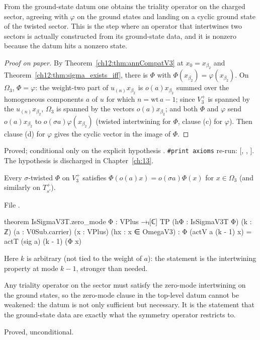 \begin{physics}
From the ground-state datum one obtains the triality operator on the charged sector, agreeing with $\varphi$ on the ground states and landing on a cyclic ground state of the twisted sector. This is the step where an operator that intertwines two sectors is actually constructed from its ground-state data, and it is nonzero because the datum hits a nonzero state.
\end{physics}
\begin{proof}[Proof on paper]
By Theorem~\ref{ch12:thm:annCompatV3} at $x_0=x_{\beta_2}$ and Theorem~\ref{ch12:thm:sigma_exists_iff},
there is $\Phi$ with $\Phi(x_{\beta_2})=\varphi(x_{\beta_2})$.  On $\Omega_3$, $\Phi=\varphi$: the weight-two
part of $u_{(n)}x_{\beta_2}$ is $o(a)x_{\beta_2}$ summed over the homogeneous components $a$ of $u$
for which $n=\mathrm{wt}\,a-1$; since $V_3^+$ is spanned by the $u_{(n)}x_{\beta_2}$, $\Omega_3$ is spanned
by the vectors $o(a)x_{\beta_2}$; and both $\Phi$ and $\varphi$ send $o(a)x_{\beta_2}$ to
$o(\sigma a)\varphi(x_{\beta_2})$ (twisted intertwining for $\Phi$, clause (c) for $\varphi$).  Then
clause (d) for $\varphi$ gives the cyclic vector in the image of $\Phi$.
\end{proof}
\begin{status}Proved; conditional only on the explicit hypothesis .
\texttt{\#print axioms} re-run: [, , ].
The hypothesis is discharged in Chapter~\ref{ch:13}.\end{status}

\begin{theorem}\label{ch12:thm:necessity}
Every $\sigma$-twisted $\Phi$ on $V_3^+$ satisfies $\Phi(o(a)x)=o(\sigma a)\Phi(x)$ for $x\in\Omega_3$
(and similarly on $T_{s'}^+$).
\end{theorem}
File .
\begin{leancode}
theorem IsSigmaV3T.zero_mode {Φ : VPlus →ₗ[ℂ] TP} (hΦ : IsSigmaV3T Φ) (k : ℤ) (a : V0Sub.carrier)
    (x : VPlus) (hx : x ∈ OmegaV3) : Φ (actV a (k - 1) x) = actT (sig a) (k - 1) (Φ x)
\end{leancode}
\begin{dictionary}
Here $k$ is arbitrary (not tied to the weight of $a$): the statement is the intertwining
property at mode $k-1$, stronger than needed.
\end{dictionary}

\begin{physics}
Any triality operator on the sector must satisfy the zero-mode intertwining on the ground states, so the zero-mode clause in the top-level datum cannot be weakened: the datum is not only sufficient but necessary. It is the statement that the ground-state data are exactly what the symmetry operator restricts to.
\end{physics}
\begin{status}Proved, unconditional.\end{status}


